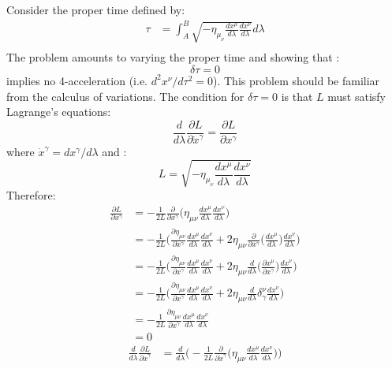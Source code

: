 \documentclass[9pt]{report}
\begin{document}
\begin{enumerate}
  Consider the proper time defined by:
  \[
    \begin{align}
      \tau &= \int_A^B \sqrt{-\eta_\mu_\nu \frac{dx^\mu}{d\lambda} \frac{dx^\nu}{d\lambda}} d \lambda\\
    \end{align}
  \]
  The problem amounts to varying the proper time and showing that :
  \[
    \delta \tau = 0
  \]
  implies no 4-acceleration (i.e. $d^2x^\nu/d\tau^2 = 0$). This problem should be familiar from the calculus of
  variations. The condition for $\delta \tau = 0$ is that $L$ must satisfy
  Lagrange's equations:
  \[
    \frac{d}{d\lambda} \frac{\partial L}{\partial \dot{x}^\gamma} = \frac{\partial L}{\partial x^\gamma}
  \]
  where $\dot{x}^\gamma = dx^\gamma/d\lambda$ and :
  \[
    L = \sqrt{-\eta_\mu_\nu \frac{dx^\mu}{d\lambda} \frac{dx^\nu}{d\lambda}}
  \]
  Therefore:
  \[
  \begin{align}
    \frac{\partial L}{\partial x^\gamma} &= -\frac{1}{2L}\frac{\partial}{\partial x^\gamma}\Big(\eta_{\mu\nu} \frac{dx^\mu}{d\lambda} \frac{dx^\nu}{d\lambda} \Big) \\
                                         &=-\frac{1}{2L}\Big(\frac{\partial\eta_{\mu\nu}}{\partial x^\gamma} \frac{dx^\mu}{d\lambda} \frac{dx^\nu}{d\lambda} + 2\eta_{\mu\nu} \frac{\partial}{\partial x^\gamma} \Big( \frac{dx^\mu}{ d\lambda} \Big) \frac{dx^\nu}{d\lambda} \Big)\\
                                         &=-\frac{1}{2L}\Big(\frac{\partial\eta_{\mu\nu}}{\partial x^\gamma} \frac{dx^\mu}{d\lambda} \frac{dx^\nu}{d\lambda} + 2\eta_{\mu\nu} \frac{d}{d\lambda} \Big( \frac{\partial x^\mu}{ \partial x^\gamma} \Big) \frac{dx^\nu}{d\lambda} \Big)\\
                                         &=-\frac{1}{2L}\Big(\frac{\partial\eta_{\mu\nu}}{\partial x^\gamma} \frac{dx^\mu}{d\lambda} \frac{dx^\nu}{d\lambda} + 2\eta_{\mu\nu} \frac{d}{d\lambda} \delta^\nu_\gamma \frac{dx^\nu}{d\lambda} \Big)\\
                                         &=-\frac{1}{2L}\frac{\partial\eta_{\mu\nu}}{\partial x^\gamma} \frac{dx^\mu}{d\lambda} \frac{dx^\nu}{d\lambda} \\
                                         &= 0
  \end{align}
  \]
  \[
    \begin{align}
      \frac{d}{d\lambda} \frac{\partial L}{\partial \dot{x}^\gamma} &= \frac{d}{d\lambda} \Big( -\frac{1}{2L} \frac{\partial}{\partial \dot{x}^\gamma}\Big(\eta_{\mu\nu} \frac{dx^\mu}{d\lambda} \frac{dx^\nu}{d\lambda} \Big) \Big)\\

\end{align}\]
\end{enumerate}
\end{document}

